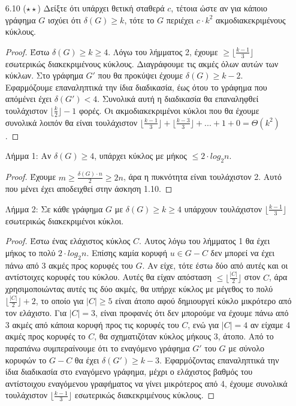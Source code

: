 \documentclass[a4paper, oneside, 11pt]{article}
\begin{document}
\begin{enumerate}
\item[6.10 ($\star\star$)]
	Δείξτε ότι υπάρχει θετική σταθερά $c$, τέτοια ώστε αν για κάποιο γράφημα $G$ ισχύει ότι $\delta (G)\geq k$, τότε το $G$ περιέχει $c\cdot k^2$ ακμοδιακεκριμένους κύκλους.

\begin{proof}
Έστω $\delta(G)\geq k\geq 4$. Λόγω του λήμματος 2, έχουμε $\geq \lfloor \frac{k-1}{3}\rfloor$ εσωτερικώς διακεκριμένους κύκλους. Διαγράφουμε τις ακμές όλων αυτών των κύκλων. Στο γράφημα
$G'$ που θα προκύψει έχουμε $\delta(G)\geq k-2$. Εφαρμόζουμε επαναληπτικά την ίδια διαδικασία, έως ότου το γράφημα που απόμένει έχει $\delta(G')<4$. Συνολικά αυτή η διαδικασία θα επαναληφθεί
τουλάχιστον $\lfloor\frac{k}{2}\rfloor -1$ φορές. Οι ακμοδιακεκριμένοι κύκλοι που θα έχουμε συνολικά λοιπόν θα είναι τουλάχιστον $\lfloor \frac{k-1}{3}\rfloor + \lfloor \frac{k-3}{3}\rfloor + ... + 1 + 0 = \Theta (k^2)$.
\end{proof}

Λήμμα 1: Αν $\delta(G)\geq 4$, υπάρχει κύκλος με μήκος $\leq 2\cdot log_2 n$.
\begin{proof}
Έχουμε $m\geq \frac{\delta(G)\cdot n}{2}\geq 2n$, άρα η πυκνότητα είναι τουλάχιστον 2. Αυτό που μένει έχει αποδειχθεί στην άσκηση 1.10.
\end{proof}

Λήμμα 2: Σε κάθε γράφημα $G$ με $\delta(G)\geq k\geq 4$ υπάρχουν τουλάχιστον $\lfloor \frac{k-1}{3}\rfloor$ εσωτερικώς διακεκριμένοι κύκλοι.
\begin{proof}
Έστω ένας ελάχιστος κύκλος $C$. Αυτος λόγω του λήμματος 1 θα έχει μήκος το πολύ $2\cdot log_2 n$. Επίσης καμία κορυφή $u\in G-C$ δεν μπορεί να έχει πάνω από 3 ακμές προς κορυφές του $G$.
Αν είχε, τότε έστω δύο από αυτές και οι αντίστοιχες κορυφές του κύκλου. Αυτές θα είχαν απόσταση $\leq \lfloor \frac{|C|}{2}\rfloor$ στον $C$, άρα χρησιμοποιώντας αυτές τις δύο ακμές, 
θα υπήρχε κύκλος με μέγεθος το πολύ
$\lfloor\frac{|C|}{2}\rfloor + 2$, το οποίο για $|C|\geq 5$ είναι άτοπο αφού δημιουργεί κύκλο μικρότερο από τον ελάχιστο. Για $|C|=3$, είναι προφανές ότι δεν μπορούμε να έχουμε πάνω από 3
ακμές από κάποια κορυφή προς τις κορυφές του $C$, ενώ για $|C|=4$ αν είχαμε 4 ακμές προς κορυφές το $C$, θα σχηματιζόταν κύκλος μήκους 3, άτοπο.
Από το παραπάνω συμπεραίνουμε ότι το εναγόμενο γράφημα $G'$ του $G$ με σύνολο κορυφών το $G-C$ θα έχει $\delta(G') \geq k-3$. Εφαρμόζοντας επαναληπτικά την ίδια διαδικασία στο εναγόμενο 
γράφημα, μέχρι ο ελάχιστος
βαθμός του αντίστοιχου εναγόμενου γραφήματος να γίνει μικρότερος από 4, έχουμε συνολικά τουλάχιστον $\lfloor \frac{k-1}{3}\rfloor$ εσωτερικώς διακεκριμένους κύκλους.
\end{proof}

\end{enumerate}
\end{document}
